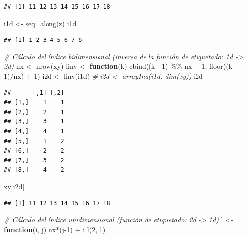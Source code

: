 \documentclass[
]{book}
\newenvironment{Shaded}{\begin{snugshade}}{\end{snugshade}}
\newcommand{\CommentTok}[1]{\textcolor[rgb]{0.56,0.35,0.01}{\textit{#1}}}
\newcommand{\ControlFlowTok}[1]{\textcolor[rgb]{0.13,0.29,0.53}{\textbf{#1}}}
\newcommand{\DecValTok}[1]{\textcolor[rgb]{0.00,0.00,0.81}{#1}}
\newcommand{\FunctionTok}[1]{\textcolor[rgb]{0.00,0.00,0.00}{#1}}
\newcommand{\NormalTok}[1]{#1}
\newcommand{\OtherTok}[1]{\textcolor[rgb]{0.56,0.35,0.01}{#1}}
\newcommand{\SpecialCharTok}[1]{\textcolor[rgb]{0.00,0.00,0.00}{#1}}
\theoremstyle{break}
\theoremstyle{definition}
\theoremstyle{definition}
\theoremstyle{definition}
\theoremstyle{definition}
\theoremstyle{remark}
\begin{document}
\begin{verbatim}
## [1] 11 12 13 14 15 16 17 18
\end{verbatim}

\begin{Shaded}
\begin{Highlighting}[]
\NormalTok{i1d }\OtherTok{\textless{}{-}} \FunctionTok{seq\_along}\NormalTok{(z)}
\NormalTok{i1d }
\end{Highlighting}
\end{Shaded}

\begin{verbatim}
## [1] 1 2 3 4 5 6 7 8
\end{verbatim}

\begin{Shaded}
\begin{Highlighting}[]
\CommentTok{\# Cálculo del índice bidimensional (inversa de la función de etiquetado: 1d {-}\textgreater{} 2d)}
\NormalTok{nx }\OtherTok{\textless{}{-}} \FunctionTok{nrow}\NormalTok{(xy)}
\NormalTok{linv }\OtherTok{\textless{}{-}} \ControlFlowTok{function}\NormalTok{(k) }\FunctionTok{cbind}\NormalTok{((k }\SpecialCharTok{{-}} \DecValTok{1}\NormalTok{) }\SpecialCharTok{\%\%}\NormalTok{ nx }\SpecialCharTok{+} \DecValTok{1}\NormalTok{, }\FunctionTok{floor}\NormalTok{((k }\SpecialCharTok{{-}} \DecValTok{1}\NormalTok{)}\SpecialCharTok{/}\NormalTok{nx) }\SpecialCharTok{+} \DecValTok{1}\NormalTok{)}
\NormalTok{i2d }\OtherTok{\textless{}{-}} \FunctionTok{linv}\NormalTok{(i1d)}
\CommentTok{\# i2d \textless{}{-} arrayInd(i1d, dim(xy))}
\NormalTok{i2d}
\end{Highlighting}
\end{Shaded}

\begin{verbatim}
##      [,1] [,2]
## [1,]    1    1
## [2,]    2    1
## [3,]    3    1
## [4,]    4    1
## [5,]    1    2
## [6,]    2    2
## [7,]    3    2
## [8,]    4    2
\end{verbatim}

\begin{Shaded}
\begin{Highlighting}[]
\NormalTok{xy[i2d]}
\end{Highlighting}
\end{Shaded}

\begin{verbatim}
## [1] 11 12 13 14 15 16 17 18
\end{verbatim}

\begin{Shaded}
\begin{Highlighting}[]
\CommentTok{\# Cálculo del índice unidimensional (función de etiquetado: 2d {-}\textgreater{} 1d)}
\NormalTok{l }\OtherTok{\textless{}{-}} \ControlFlowTok{function}\NormalTok{(i, j) nx}\SpecialCharTok{*}\NormalTok{(j}\DecValTok{{-}1}\NormalTok{) }\SpecialCharTok{+}\NormalTok{ i}
\FunctionTok{l}\NormalTok{(}\DecValTok{2}\NormalTok{, }\DecValTok{1}\NormalTok{)}
\end{Highlighting}
\end{Shaded}
\end{document}
